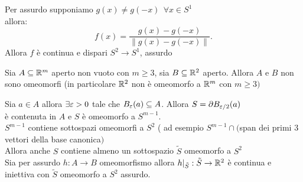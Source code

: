 \documentclass[12px]{article}
\begin{document}
\begin{dimo}
	Per assurdo supponiamo $g(x)\neq g(-x) \ \ \forall x\in S^1$\\
	allora:
	\[
		f(x) = \frac{g(x) - g(-x)}{\|g(x)-g(-x)\|}
	.\] 
	Allora $f$ è continua e dispari $S^2 \rightarrow S^1$, assurdo
\end{dimo}
\begin{coro}
	Sia $A\subseteq\mathbb{R}^m$ aperto non vuoto con  $m\geq 3$, sia  $B\subseteq \mathbb{R}^2$ aperto. Allora $A$ e  $B$ non sono omeomorfi (in particolare  $\mathbb{R}^2$ non è omeomorfo a  $\mathbb{R}^m$ con  $m\geq 3)$
\end{coro}
\begin{dimo}
	Sia $a\in A$ allora  $\exists \varepsilon > 0 $ tale che  $B_\varepsilon(a) \subseteq A$. Allora  $S = \partial B_{\varepsilon/2}(a)$\\
	è contenuta in  $A$ e  $S$ è omeomorfo a $S^{m-1}$.\\
	$S^{m-1}$ contiene sottospazi omeomorfi a  $S^2$ ( ad esempio $S^{m-1}\cap ($span dei primi 3 vettori della base canonica$)$\\
	Allora anche  $S$ contiene almeno un sottospazio  $\tilde S$ omeomorfo a  $S^2$\\
	Sia per assurdo  $h: A \rightarrow B$ omeomorfismo allora $h|_{\tilde S}:\tilde S \rightarrow \mathbb{R}^2$ è continua e iniettiva con $\tilde S$ omeomorfo a $S^2$ assurdo.
\end{dimo}
\end{document}
